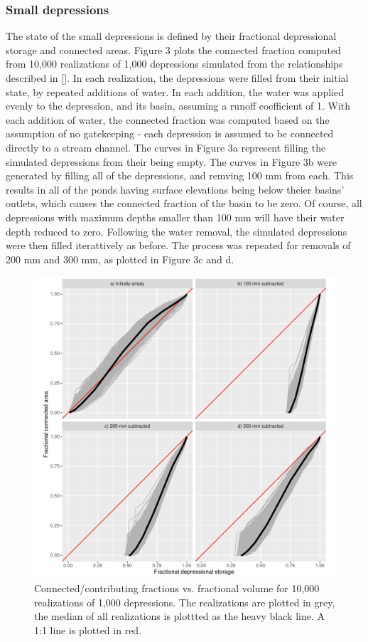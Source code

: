 \documentclass[draft,linenumbers]{agujournal2018}
\begin{document}
\subsubsection{Small depressions}

The state of the small depressions is defined by their fractional
depressional storage and connected areas. Figure 3 plots the connected
fraction computed from 10,000 realizations of 1,000 depressions
simulated from the relationships described in {[}{]}. In each
realization, the depressions were filled from their initial state, by
repeated additions of water. In each addition, the water was applied
evenly to the depression, and its basin, assuming a runoff coefficient
of 1. With each addition of water, the connected fraction was computed
based on the assumption of no gatekeeping - each depression is assumed
to be connected directly to a stream channel. The curves in Figure 3a
represent filling the simulated depressions from their being empty. The
curves in Figure 3b were generated by filling all of the depressions,
and remving 100 mm from each. This results in all of the ponds having
surface elevations being below theier basins' outlets, which causes the
connected fraction of the basin to be zero. Of course, all depressions
with maximum depths smaller than 100 mm will have their water depth
reduced to zero. Following the water removal, the simulated depressions
were then filled iterattively as before. The process was repeated for
removals of 200 mm and 300 mm, as plotted in Figure 3c and d.

\begin{figure}[h]
\includegraphics[width=1\linewidth,]{figures/all_filling_curves} \caption{Connected/contributing fractions vs. fractional volume for 10,000 realizations of 1,000 depressions. The realizations are plotted in grey, the median of all realizations is plottted
as the heavy black line. A 1:1 line is plotted in red.}\label{fig:unnamed-chunk-3}
\end{figure}
\end{document}
